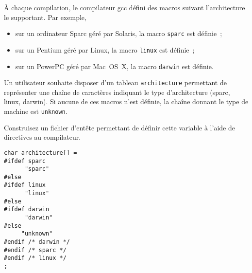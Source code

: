 \`A chaque compilation, le compilateur gcc d\'efini des macros suivant
l'architecture le supportant. Par exemple, 
\begin{itemize}
\item sur un ordinateur Sparc g\'er\'e par Solaris, la macro
  \verb+sparc+ est d\'efinie~;
\item sur un Pentium g\'er\'e par Linux, la macro \verb+linux+ est
  d\'efinie~;
\item sur un PowerPC g\'er\'e par Mac~OS~X, la macro \verb+darwin+ est
  d\'efinie.
\end{itemize}
Un utilisateur souhaite disposer d'un tableau \verb+architecture+
permettant de repr\'esenter une cha\^ine de caract\`eres indiquant le
type d'architecture (sparc, linux, darwin). Si aucune de ces macros
n'est d\'efinie, la cha\^ine donnant le type de machine est \verb+unknown+.
\par\medskip
Construisez un fichier d'ent\^ete permettant de d\'efinir cette
variable \`a l'aide de  directives au compilateur.
\ifcorrection
\begin{correction}
\begin{verbatim}
char architecture[] = 
#ifdef sparc
      "sparc" 
#else
#ifdef linux
      "linux" 
#else
#ifdef darwin
      "darwin" 
#else 
     "unknown" 
#endif /* darwin */
#endif /* sparc */ 
#endif /* linux */
;
\end{verbatim}
\end{correction}
\fi